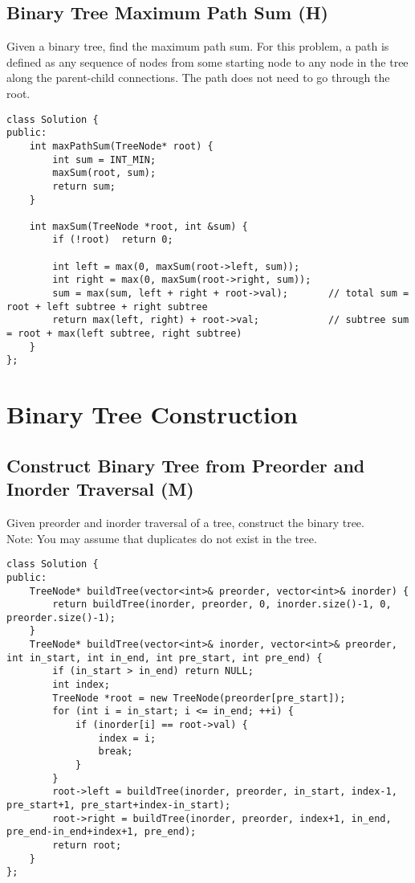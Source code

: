 \subsection{Binary Tree Maximum Path Sum (H)}
Given a binary tree, find the maximum path sum. For this problem, a path is defined as any sequence of nodes from some starting node to any node in the tree along the parent-child connections. The path does not need to go through the root. \\

\begin{lstlisting}
class Solution {
public:
    int maxPathSum(TreeNode* root) {
        int sum = INT_MIN;
        maxSum(root, sum);
        return sum;
    }
    
    int maxSum(TreeNode *root, int &sum) {
        if (!root)  return 0;
        
        int left = max(0, maxSum(root->left, sum));
        int right = max(0, maxSum(root->right, sum));
        sum = max(sum, left + right + root->val);       // total sum = root + left subtree + right subtree
        return max(left, right) + root->val;            // subtree sum = root + max(left subtree, right subtree)
    }
};
\end{lstlisting}


\section{Binary Tree Construction}
\subsection{Construct Binary Tree from Preorder and Inorder Traversal (M)}
Given preorder and inorder traversal of a tree, construct the binary tree.\\

Note: You may assume that duplicates do not exist in the tree. \\

\begin{lstlisting}
class Solution {
public:
    TreeNode* buildTree(vector<int>& preorder, vector<int>& inorder) {
        return buildTree(inorder, preorder, 0, inorder.size()-1, 0, preorder.size()-1);
    }
    TreeNode* buildTree(vector<int>& inorder, vector<int>& preorder, int in_start, int in_end, int pre_start, int pre_end) {
        if (in_start > in_end) return NULL;
        int index;
        TreeNode *root = new TreeNode(preorder[pre_start]);
        for (int i = in_start; i <= in_end; ++i) {
            if (inorder[i] == root->val) {
                index = i;
                break;
            }
        }
        root->left = buildTree(inorder, preorder, in_start, index-1, pre_start+1, pre_start+index-in_start);
        root->right = buildTree(inorder, preorder, index+1, in_end, pre_end-in_end+index+1, pre_end);
        return root;
    }
};
\end{lstlisting}


